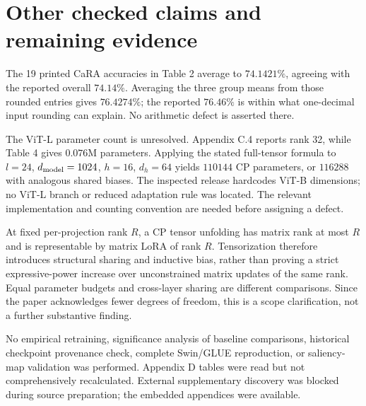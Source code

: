 \documentclass[10pt]{article}
\begin{document}
\section*{Other checked claims and remaining evidence}
The 19 printed CaRA accuracies in Table 2 average to \(74.1421\%\), agreeing with the reported overall \(74.14\%\). Averaging the three group means from those rounded entries gives \(76.4274\%\); the reported \(76.46\%\) is within what one-decimal input rounding can explain. No arithmetic defect is asserted there.\par
The ViT-L parameter count is unresolved. Appendix C.4 reports rank 32, while Table 4 gives \(0.076\)M parameters. Applying the stated full-tensor formula to \(l=24\), \(d_{\rm model}=1024\), \(h=16\), \(d_h=64\) yields \(110144\) CP parameters, or \(116288\) with analogous shared biases. The inspected release hardcodes ViT-B dimensions; no ViT-L branch or reduced adaptation rule was located. The relevant implementation and counting convention are needed before assigning a defect.\par
At fixed per-projection rank \(R\), a CP tensor unfolding has matrix rank at most \(R\) and is representable by matrix LoRA of rank \(R\). Tensorization therefore introduces structural sharing and inductive bias, rather than proving a strict expressive-power increase over unconstrained matrix updates of the same rank. Equal parameter budgets and cross-layer sharing are different comparisons. Since the paper acknowledges fewer degrees of freedom, this is a scope clarification, not a further substantive finding.\par
No empirical retraining, significance analysis of baseline comparisons, historical checkpoint provenance check, complete Swin/GLUE reproduction, or saliency-map validation was performed. Appendix D tables were read but not comprehensively recalculated. External supplementary discovery was blocked during source preparation; the embedded appendices were available.\par
\end{document}
